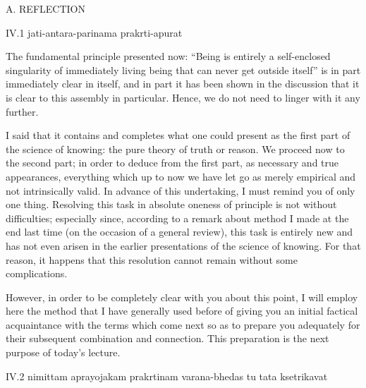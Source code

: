 A. REFLECTION

IV.1
jati-antara-parinama prakrti-apurat

The fundamental principle presented now:
“Being is entirely a self-enclosed singularity
of immediately living being
that can never get outside itself”
is in part immediately clear in itself,
and in part it has been shown in the discussion
that it is clear to this assembly in particular.
Hence, we do not need to linger with it any further.

I said that it contains and completes
what one could present as the first part
of the science of knowing:
the pure theory of truth or reason.
We proceed now to the second part;
in order to deduce from the first part,
as necessary and true appearances,
everything which up to now we have
let go as merely empirical
and not intrinsically valid.
In advance of this undertaking,
I must remind you of only one thing.
Resolving this task in absolute oneness
of principle is not without difficulties;
especially since, according to a remark about method
I made at the end last time
(on the occasion of a general review),
this task is entirely new
and has not even arisen in the earlier
presentations of the science of knowing.
For that reason, it happens that this resolution
cannot remain without some complications.

However, in order to be completely clear with you about this point,
I will employ here the method that I have generally used before
of giving you an initial factical acquaintance with the terms
which come next so as to prepare you adequately
for their subsequent combination and connection.
This preparation is the next purpose of today's lecture.

IV.2
nimittam aprayojakam prakrtinam varana-bhedas tu tata ksetrikavat

